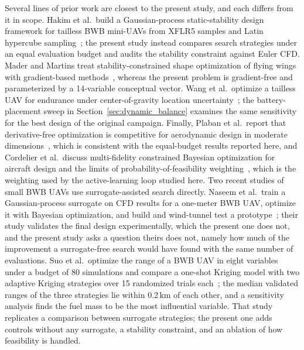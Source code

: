 Several lines of prior work are closest to the present study, and each differs from it in scope. Hakim et al.\ build a Gaussian-process static-stability design framework for tailless BWB mini-UAVs from XFLR5 samples and Latin hypercube sampling~\cite{hakim2026integrated}; the present study instead compares search strategies under an equal evaluation budget and audits the stability constraint against Euler CFD. Mader and Martins treat stability-constrained shape optimization of flying wings with gradient-based methods~\cite{mader2013stability}, whereas the present problem is gradient-free and parameterized by a 14-variable conceptual vector. Wang et al.\ optimize a tailless UAV for endurance under center-of-gravity location uncertainty~\cite{wang2015tailless}; the battery-placement sweep in Section~\ref{sec:dynamic_balance} examines the same sensitivity for the best design of the original campaign. Finally, Plaban et al.\ report that derivative-free optimization is competitive for aerodynamic design in moderate dimensions~\cite{plaban2025derivative}, which is consistent with the equal-budget results reported here, and Cordelier et al.\ discuss multi-fidelity constrained Bayesian optimization for aircraft design and the limits of probability-of-feasibility weighting~\cite{cordelier2026multifidelity}, which is the weighting used by the active-learning loop studied here. Two recent studies of small BWB UAVs use surrogate-assisted search directly. Naseem et al.\ train a Gaussian-process surrogate on CFD results for a one-meter BWB UAV, optimize it with Bayesian optimization, and build and wind-tunnel test a prototype~\cite{naseem2026blended}; their study validates the final design experimentally, which the present one does not, and the present study asks a question theirs does not, namely how much of the improvement a surrogate-free search would have found with the same number of evaluations. Suo et al.\ optimize the range of a BWB UAV in eight variables under a budget of 80 simulations and compare a one-shot Kriging model with two adaptive Kriging strategies over 15 randomized trials each~\cite{suo2026kriging}; the median validated ranges of the three strategies lie within 0.2\,km of each other, and a sensitivity analysis finds the fuel mass to be the most influential variable. That study replicates a comparison between surrogate strategies; the present one adds controls without any surrogate, a stability constraint, and an ablation of how feasibility is handled.

